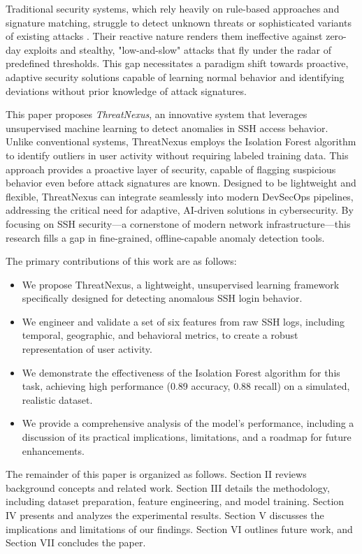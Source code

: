 \documentclass[conference]{IEEEtran}
\begin{document}
Traditional security systems, which rely heavily on rule-based approaches and signature matching, struggle to detect unknown threats or sophisticated variants of existing attacks \cite{garcia2009anomaly}. Their reactive nature renders them ineffective against zero-day exploits and stealthy, "low-and-slow" attacks that fly under the radar of predefined thresholds. This gap necessitates a paradigm shift towards proactive, adaptive security solutions capable of learning normal behavior and identifying deviations without prior knowledge of attack signatures.

This paper proposes \textit{ThreatNexus}, an innovative system that leverages unsupervised machine learning to detect anomalies in SSH access behavior. Unlike conventional systems, ThreatNexus employs the Isolation Forest algorithm \cite{liu2008isolation} to identify outliers in user activity without requiring labeled training data. This approach provides a proactive layer of security, capable of flagging suspicious behavior even before attack signatures are known. Designed to be lightweight and flexible, ThreatNexus can integrate seamlessly into modern DevSecOps pipelines, addressing the critical need for adaptive, AI-driven solutions in cybersecurity. By focusing on SSH security—a cornerstone of modern network infrastructure—this research fills a gap in fine-grained, offline-capable anomaly detection tools.

The primary contributions of this work are as follows:
\begin{itemize}
    \item We propose ThreatNexus, a lightweight, unsupervised learning framework specifically designed for detecting anomalous SSH login behavior.
    \item We engineer and validate a set of six features from raw SSH logs, including temporal, geographic, and behavioral metrics, to create a robust representation of user activity.
    \item We demonstrate the effectiveness of the Isolation Forest algorithm for this task, achieving high performance (0.89 accuracy, 0.88 recall) on a simulated, realistic dataset.
    \item We provide a comprehensive analysis of the model's performance, including a discussion of its practical implications, limitations, and a roadmap for future enhancements.
\end{itemize}

The remainder of this paper is organized as follows. Section II reviews background concepts and related work. Section III details the methodology, including dataset preparation, feature engineering, and model training. Section IV presents and analyzes the experimental results. Section V discusses the implications and limitations of our findings. Section VI outlines future work, and Section VII concludes the paper.
\end{document}
